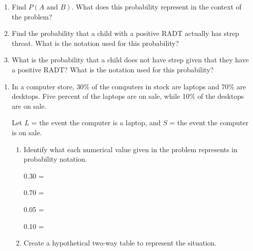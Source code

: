 \documentclass[
]{report}
\begin{document}
\begin{enumerate}
\def\labelenumi{\alph{enumi}.}
\setcounter{enumi}{2}
\item
  Find \(P(A \mbox{ and } B)\). What does this probability represent in the context of the problem?
  \vspace{.8in}
\item
  Find the probability that a child with a positive RADT actually has strep throat. What is the notation used for this probability?
  \vspace{.8in}
\item
  What is the probability that a child does not have strep given that they have a positive RADT? What is the notation used for this probability?
\end{enumerate}

\newpage

\begin{enumerate}
\def\labelenumi{\arabic{enumi}.}
\setcounter{enumi}{2}
\item
  In a computer store, 30\% of the computers in stock are laptops and 70\% are desktops. Five percent of the laptops are on sale, while 10\% of the desktops are on sale.
  \vspace{1mm}

  Let \(L\) = the event the computer is a laptop, and \(S\) = the event the computer is on sale.
  \vspace{0.1in}

  \begin{enumerate}
  \def\labelenumii{\alph{enumii}.}
  \item
    Identify what each numerical value given in the problem represents in probability notation.
    \vspace{.1in}

    0.30 =\\
    \vspace{.1in}

    0.70 =\\
    \vspace{.1in}

    0.05 =\\
    \vspace{.1in}

    0.10 =\\
    \vspace{.1in}
  \item
    Create a hypothetical two-way table to represent the situation.
  \end{enumerate}
\end{enumerate}
\end{document}
